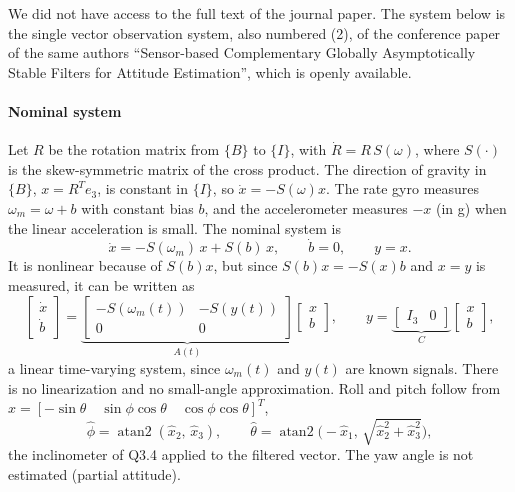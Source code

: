 \documentclass[10pt,a4paper]{article}
\newenvironment{answer}{%
  \begin{tcolorbox}[breakable,enhanced,colback=white,colframe=greyline,
    boxrule=0.6pt,arc=2pt,left=8pt,right=8pt,top=7pt,bottom=7pt,
    before skip=0pt,after skip=12pt]
}{\end{tcolorbox}}
\newcommand{\fB}{\{B\}}
\newcommand{\fI}{\{I\}}
\begin{document}
\begin{answer}
We did not have access to the full text of the journal paper. The system
below is the single vector observation system, also numbered (2), of the
conference paper of the same authors ``Sensor-based Complementary
Globally Asymptotically Stable Filters for Attitude Estimation'', which
is openly available.

\paragraph{Nominal system}
Let $R$ be the rotation matrix from $\fB$ to $\fI$, with
$\dot R = R\,S(\omega)$, where $S(\cdot)$ is the skew-symmetric matrix
of the cross product. The direction of gravity in $\fB$,
$x = R^Te_3$, is constant in $\fI$, so $\dot x = -S(\omega)x$. The rate
gyro measures $\omega_m = \omega + b$ with constant bias $b$, and the
accelerometer measures $-x$ (in g) when the linear acceleration is
small. The nominal system is
\[
  \dot x = -S(\omega_m)\,x + S(b)\,x, \qquad \dot b = 0, \qquad y = x .
\]
It is nonlinear because of $S(b)x$, but since $S(b)x = -S(x)b$ and
$x=y$ is measured, it can be written as
\[
  \begin{bmatrix}\dot x\\ \dot b\end{bmatrix} =
  \underbrace{\begin{bmatrix} -S(\omega_m(t)) & -S(y(t))\\ 0 & 0 \end{bmatrix}}_{A(t)}
  \begin{bmatrix} x\\ b\end{bmatrix},
  \qquad
  y = \underbrace{\begin{bmatrix} I_3 & 0 \end{bmatrix}}_{C}
  \begin{bmatrix} x\\ b\end{bmatrix},
\]
a linear time-varying system, since $\omega_m(t)$ and $y(t)$ are known
signals. There is no linearization and no small-angle approximation.
Roll and pitch follow from
$x = [-\sin\theta \quad \sin\phi\cos\theta \quad \cos\phi\cos\theta]^T$,
\[
  \hat\phi = \operatorname{atan2}(\hat x_2,\,\hat x_3), \qquad
  \hat\theta = \operatorname{atan2}\!\big(-\hat x_1,\,\sqrt{\hat x_2^2+\hat x_3^2}\big),
\]
the inclinometer of Q3.4 applied to the filtered vector. The yaw angle
is not estimated (partial attitude).


\end{answer}
\end{document}
